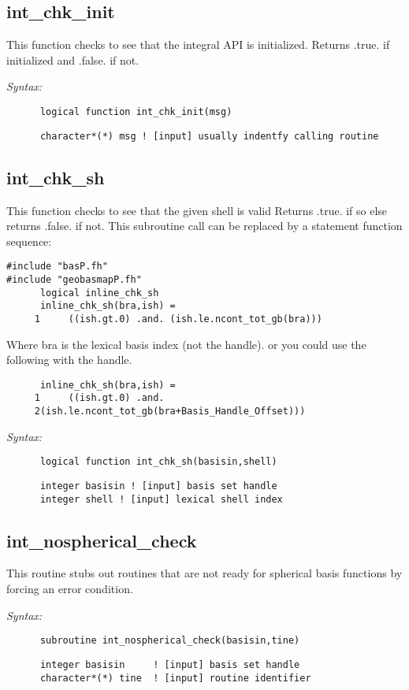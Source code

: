 \subsection{int\_chk\_init} 
This function checks to see that the integral API is initialized. 
Returns .true. if initialized and .false. if not. 
 
{\it Syntax:} 
\begin{verbatim} 
      logical function int_chk_init(msg) 
\end{verbatim} 
\begin{verbatim} 
      character*(*) msg ! [input] usually indentfy calling routine 
\end{verbatim} 
\subsection{int\_chk\_sh} 
This function checks to see that the given shell is valid 
Returns .true. if so else returns .false. if not. 
This subroutine call can be replaced by a statement  
function sequence: 
\begin{verbatim} 
#include "basP.fh" 
#include "geobasmapP.fh" 
      logical inline_chk_sh 
      inline_chk_sh(bra,ish) = 
     1     ((ish.gt.0) .and. (ish.le.ncont_tot_gb(bra))) 
\end{verbatim} 
Where bra is the lexical basis index (not the handle). 
or you could use the following with the handle. 
\begin{verbatim} 
      inline_chk_sh(bra,ish) = 
     1     ((ish.gt.0) .and.  
     2(ish.le.ncont_tot_gb(bra+Basis_Handle_Offset))) 
\end{verbatim} 
 
{\it Syntax:} 
\begin{verbatim} 
      logical function int_chk_sh(basisin,shell) 
\end{verbatim} 
\begin{verbatim} 
      integer basisin ! [input] basis set handle 
      integer shell ! [input] lexical shell index 
\end{verbatim} 
\subsection{int\_nospherical\_check} 
This routine stubs out routines that are not ready for  
spherical basis functions by forcing an error condition. 
 
{\it Syntax:} 
\begin{verbatim} 
      subroutine int_nospherical_check(basisin,tine) 
\end{verbatim} 
\begin{verbatim} 
      integer basisin     ! [input] basis set handle 
      character*(*) tine  ! [input] routine identifier 
\end{verbatim} 
